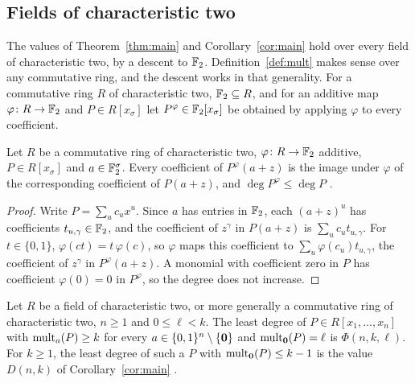 \subsection*{Fields of characteristic two}

The values of Theorem~\ref{thm:main} and Corollary~\ref{cor:main} hold over every
field of characteristic two, by a descent to \(\mathbb F_2\). Definition~\ref{def:mult}
makes sense over any commutative ring, and the descent works in that generality. For a commutative ring \(R\) of characteristic two,
\(\mathbb F_2\subseteq R\), and for an additive map \(\varphi\colon R\to\mathbb F_2\) and
\(P\in R[x_\sigma]\) let \(P^\varphi\in\mathbb F_2[x_\sigma]\) be obtained by applying
\(\varphi\) to every coefficient.

\begin{lemma}[Descent]\label{lem:descent}
Let \(R\) be a commutative ring of characteristic two, \(\varphi\colon R\to\mathbb F_2\)
additive, \(P\in R[x_\sigma]\) and \(a\in\mathbb F_2^\sigma\). Every coefficient of
\(P^\varphi(a+z)\) is the image under \(\varphi\) of the corresponding coefficient
of \(P(a+z)\), and \(\deg P^\varphi\le\deg P\)
.
\end{lemma}

\begin{proof}
Write \(P=\sum_uc_ux^u\). Since \(a\) has entries in \(\mathbb F_2\), each \((a+z)^u\) has
coefficients \(t_{u,\gamma}\in\mathbb F_2\), and the coefficient of \(z^\gamma\) in
\(P(a+z)\) is \(\sum_uc_ut_{u,\gamma}\). For \(t\in\{0,1\}\),
\(\varphi(ct)=t\,\varphi(c)\), so \(\varphi\) maps this coefficient to
\(\sum_u\varphi(c_u)t_{u,\gamma}\), the coefficient of \(z^\gamma\) in
\(P^\varphi(a+z)\). A monomial with coefficient zero in \(P\) has coefficient
\(\varphi(0)=0\) in \(P^\varphi\), so the degree does not increase.
\end{proof}

\begin{theorem}\label{thm:char-two}
Let \(R\) be a field of characteristic two, or more generally a commutative ring
of characteristic two, \(n\ge1\) and \(0\le\ell<k\). The least degree of
\(P\in R[x_1,\ldots,x_n]\) with \(\operatorname{mult}_a(P)\ge k\) for every
\(a\in\{0,1\}^n\setminus\{\mathbf 0\}\) and \(\operatorname{mult}_{\mathbf 0}(P)=\ell\) is
\(\Phi(n,k,\ell)\). For \(k\ge1\), the least degree of such a \(P\) with
\(\operatorname{mult}_{\mathbf 0}(P)\le k-1\) is the value \(D(n,k)\) of Corollary~\ref{cor:main}
.
\end{theorem}

